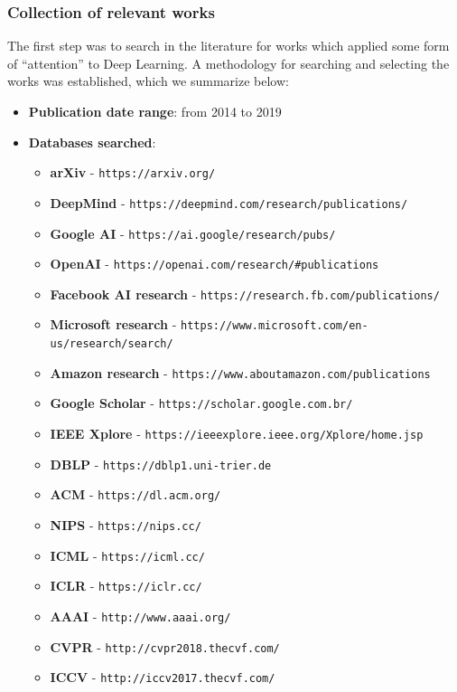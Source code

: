 \documentclass[12pt]{article}
\begin{document}
\subsubsection{Collection of relevant works}
The first step was to search in the literature for works which applied some form
of ``attention'' to Deep Learning.
A methodology for searching and selecting the works was established,
which we summarize below:

\begin{itemize}
    \item \textbf{Publication date range}: from 2014 to 2019
    \item \textbf{Databases searched}:
    \begin{itemize}
        \item \textbf{arXiv} - \texttt{https://arxiv.org/}
        \item \textbf{DeepMind} - \texttt{https://deepmind.com/research/publications/}
        \item \textbf{Google AI} - \texttt{https://ai.google/research/pubs/}
        \item \textbf{OpenAI} - \texttt{https://openai.com/research/#publications}
        \item \textbf{Facebook AI research} - \texttt{https://research.fb.com/publications/}
        \item \textbf{Microsoft research} - \texttt{https://www.microsoft.com/en-us/research/search/}
        \item \textbf{Amazon research} - \texttt{https://www.aboutamazon.com/publications}
        \item \textbf{Google Scholar} - \texttt{https://scholar.google.com.br/}
        \item \textbf{IEEE Xplore} - \texttt{https://ieeexplore.ieee.org/Xplore/home.jsp}
        \item \textbf{DBLP} - \texttt{https://dblp1.uni-trier.de}
        \item \textbf{ACM} - \texttt{https://dl.acm.org/}
        \item \textbf{NIPS} - \texttt{https://nips.cc/}
        \item \textbf{ICML} - \texttt{https://icml.cc/}
        \item \textbf{ICLR} - \texttt{https://iclr.cc/}
        \item \textbf{AAAI} - \texttt{http://www.aaai.org/}
        \item \textbf{CVPR} - \texttt{http://cvpr2018.thecvf.com/}
        \item \textbf{ICCV} - \texttt{http://iccv2017.thecvf.com/}

\end{itemize}
\end{itemize}
\end{document}
